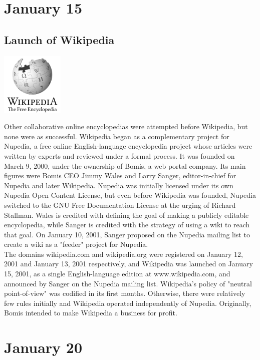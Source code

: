 \documentclass[11pt]{report}
\begin{document}
\section{January 15}
\subsection{Launch of Wikipedia}
\vspace{2mm}\begin{center}\includegraphics[width=3cm]{./img/wikipedia.jpg}\end{center}
Other collaborative online encyclopedias were attempted before Wikipedia, but none were as successful. Wikipedia began as a complementary project for Nupedia, a free online English-language encyclopedia project whose articles were written by experts and reviewed under a formal process. It was founded on March 9, 2000, under the ownership of Bomis, a web portal company. Its main figures were Bomis CEO Jimmy Wales and Larry Sanger, editor-in-chief for Nupedia and later Wikipedia. Nupedia was initially licensed under its own Nupedia Open Content License, but even before Wikipedia was founded, Nupedia switched to the GNU Free Documentation License at the urging of Richard Stallman. Wales is credited with defining the goal of making a publicly editable encyclopedia, while Sanger is credited with the strategy of using a wiki to reach that goal. On January 10, 2001, Sanger proposed on the Nupedia mailing list to create a wiki as a "feeder" project for Nupedia.\\
The domains wikipedia.com and wikipedia.org were registered on January 12, 2001 and January 13, 2001 respectively, and Wikipedia was launched on January 15, 2001, as a single English-language edition at www.wikipedia.com, and announced by Sanger on the Nupedia mailing list. Wikipedia's policy of "neutral point-of-view" was codified in its first months. Otherwise, there were relatively few rules initially and Wikipedia operated independently of Nupedia. Originally, Bomis intended to make Wikipedia a business for profit.
\section{January 20}
\end{document}
